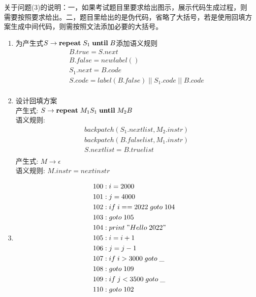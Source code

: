 \documentclass[a4paper, justified]{tufte-handout}
\begin{document}
\begin{solution}
{\color{red}关于问题(3)的说明}：一，如果考试题目里要求给出图示，展示代码生成过程，则需要按照要求给出。二，题目里给出的是伪代码，省略了大括号，若是使用回填方案生成中间代码，则需按照文法添加必要的大括号。
\begin{enumerate}[(1)]
    \item 为产生式$S\to \text{\bf repeat}\; S_1\; \text{\bf until}\; B$添加语义规则
        \begin{equation*}
            \begin{aligned}
                & B.true = S.next\\
                & B.false = newlabel()\\
                & S_1.next = B.code\\
                & S.code = label(B.false)\; ||\; S_1.code\; ||\; B.code\\
            \end{aligned}
        \end{equation*}
    \item 设计回填方案\\
    产生式: $S\to \text{\bf repeat}\; M_1 S_1\; \text{\bf until}\;M_2 B$\\
    语义规则: 
    \begin{equation*}
        \begin{aligned}
            &backpatch(S_1.nextlist, M_2.instr)\\
            &backpatch(B.falselist, M_1.instr)\\
            &S.nextlist = B.truelist\\
        \end{aligned}
    \end{equation*}
    产生式: $M\to\epsilon$ \\
    语义规则: $M.instr = nextinstr $
    \item
    \begin{equation*}
        \begin{aligned}
            & 100: i = 2000\\
            & 101: j = 4000\\
            & 102: if\; i == 2022\; goto\; 104\\
            & 103: goto\; 105\\
            & 104: print\; "Hello\; 2022"\\
            & 105: i = i + 1\\
            & 106: j = j - 1\\
            & 107: if\; i > 3000\; goto\;\_\\
            & 108: goto\; 109\\
            & 109: if\; j < 3500\; goto\;\_\\
            & 110: goto\; 102\\
        \end{aligned}
    \end{equation*}
\end{enumerate}
\end{solution}
\end{document}
